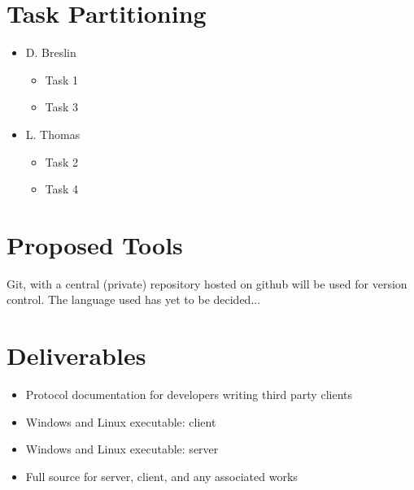 \section{Task Partitioning}
\begin{itemize}
\item D. Breslin
    \begin{itemize}
    \item Task 1
    \item Task 3
    \end{itemize}
\item L. Thomas
    \begin{itemize}
    \item Task 2
    \item Task 4
    \end{itemize}
\end{itemize}

\section{Proposed Tools}
Git, with a central (private) repository hosted on github will be used for
version control. The language used has yet to be decided...

\section{Deliverables}
\begin{itemize}
\item Protocol documentation for developers writing third party clients
\item Windows and Linux executable: client
\item Windows and Linux executable: server
\item Full source for server, client, and any associated works
\end{itemize}
